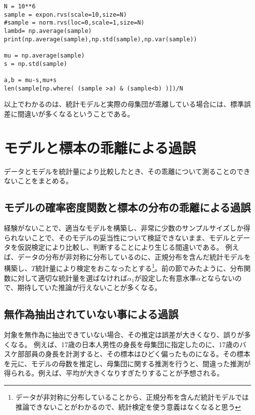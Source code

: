 \documentclass[a4paper,11pt,dvipdfmx]{jsarticle}
\begin{document}
\begin{lstlisting}
N = 10**6
sample = expon.rvs(scale=10,size=N)
#sample = norm.rvs(loc=0,scale=1,size=N)
lambd= np.average(sample)
print(np.average(sample),np.std(sample),np.var(sample))

mu = np.average(sample)
s = np.std(sample)

a,b = mu-s,mu+s
len(sample[np.where( (sample >a) & (sample<b) )])/N
\end{lstlisting}

以上でわかるのは、統計モデルと実際の母集団が乖離している場合には、標準誤差に間違いが多くなるということである。


\section{モデルと標本の乖離による過誤}
データとモデルを統計量により比較したとき、その乖離について測ることのできないことをまとめる。

\subsection{モデルの確率密度関数と標本の分布の乖離による過誤}
経験がないことで、適当なモデルを構築し、非常に少数のサンプルサイズしか得られないことで、そのモデルの妥当性について検証できないまま、モデルとデータを仮説検定により比較し、判断することにより生じる間違いである。
例えば、データの分布が非対称に分布しているのに、正規分布を含んだ統計モデルを構築し、$T$統計量により検定をおこなったとする\footnote{データが非対称に分布していることから、正規分布を含んだ統計モデルでは推論できないことがわかるので、統計検定を使う意義はなくなると思う}。前の節でみたように、分布関数に対して適切な統計量を選ばなければ$\alpha_1$が設定した有意水準$\alpha$とならないので、期待していた推論が行えないことが多くなる。

\subsection{無作為抽出されていない事による過誤}
対象を無作為に抽出できていない場合、その推定は誤差が大きくなり、誤りが多くなる。
例えば、17歳の日本人男性の身長を母集団に指定したのに、17歳のバスケ部部員の身長を計測すると、その標本はひどく偏ったものになる。その標本を元に、モデルの母数を推定し、母集団に関する推測を行うと、間違った推測が得られる。例えば、平均が大きくなりすぎたりすることが予想される。
\end{document}
